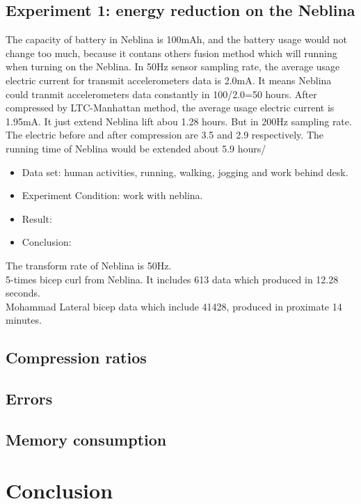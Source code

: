 \documentclass[10pt, conference, compsocconf]{IEEEtran}
\begin{document}
\subsection{Experiment 1: energy reduction on the Neblina}

The capacity of battery in Neblina is 100mAh, and the battery usage would not change too much, because it contans others fusion method which will running when turning on the Neblina.
In 50Hz sensor sampling rate, the average usage electric current for transmit accelerometers data is 2.0mA. It means Neblina could tranmit accelerometers data constantly in 100/2.0=50 hours.
After compressed by LTC-Manhattan method, the average usage electric current is 1.95mA. It just extend Neblina lift abou 1.28 hours.
But in 200Hz sampling rate. The electric before and after compression are 3.5 and 2.9 respectively. The running time of Neblina would be extended about 5.9 hours/

\begin{itemize}
    \item Data set: human activities, running, walking, jogging and work behind desk.
    \item Experiment Condition: work with neblina.
    \item Result:
    \item Conclusion:
\end{itemize}



The transform rate of Neblina is 50Hz.
\\
5-times bicep curl from Neblina. It includes 613 data which produced in 12.28 seconds.
\\
Mohammad Lateral bicep data which include 41428, produced in proximate 14 minutes.

\subsection{Compression ratios}

\subsection{Errors}

\subsection{Memory consumption}

\section{Conclusion}
\end{document}
